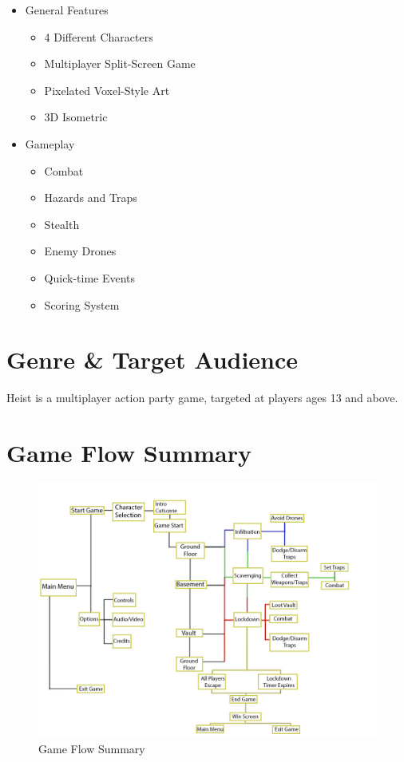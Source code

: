 \documentclass[14pt]{report}
\begin{document}
\begin{itemize}
    \item General Features
    \begin{itemize}
        \item 4 Different Characters
        \item Multiplayer Split-Screen Game
        \item Pixelated Voxel-Style Art
        \item 3D Isometric
    \end{itemize}
    \item Gameplay
    \begin{itemize}
        \item Combat
        \item Hazards and Traps
        \item Stealth
        \item Enemy Drones
        \item Quick-time Events
        \item Scoring System
    \end{itemize}
\end{itemize}

\section{Genre \& Target Audience}
Heist is a multiplayer action party game, targeted at players ages 13 and above.

\section{Game Flow Summary}

\begin{figure}[h!]
	\includegraphics[width=\linewidth]{images/gameflowsummary.jpg}
	\caption{Game Flow Summary}
\end{figure}
\end{document}
